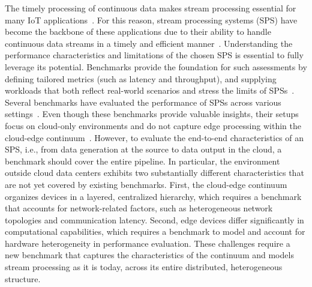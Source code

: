 \documentclass[runningheads]{llncs}
\begin{document}
The timely processing of continuous data makes stream processing essential for many IoT applications~\cite{stream-proc-survey}. 
For this reason, stream processing systems (SPS) have become the backbone of these applications due to their ability to handle continuous data streams in a timely and efficient manner~\cite {sps-survey}. 
Understanding the performance characteristics and limitations of the chosen SPS is essential to fully leverage its potential.
Benchmarks provide the foundation for such assessments by defining tailored metrics (such as latency and throughput), and supplying workloads that both reflect real-world scenarios and stress the limits of SPSs~\cite{sps_survey_2024}.
Several benchmarks have evaluated the performance of SPSs across various settings~\cite{nexmark,dongen18,espbench21,dspbench20,karimov2018,sps_survey_2024,sps-survey}.
Even though these benchmarks provide valuable insights, their setups focus on cloud-only environments and do not capture edge processing within the cloud-edge continuum~\cite{sps_survey_2024}.
However, to evaluate the end-to-end characteristics of an SPS, i.e., from data generation at the source to data output in the cloud, a benchmark should cover the entire pipeline.
In particular, the environment outside cloud data centers exhibits two substantially different characteristics that are not yet covered by existing benchmarks.
First, the cloud-edge continuum organizes devices in a layered, centralized hierarchy, which requires a benchmark that accounts for network-related factors, such as heterogeneous network topologies and communication latency.
Second, edge devices differ significantly in computational capabilities, which requires a benchmark to model and account for hardware heterogeneity in performance evaluation.
These challenges require a new benchmark that captures the characteristics of the continuum and models stream processing as it is today, across its entire distributed, heterogeneous structure.
\end{document}
